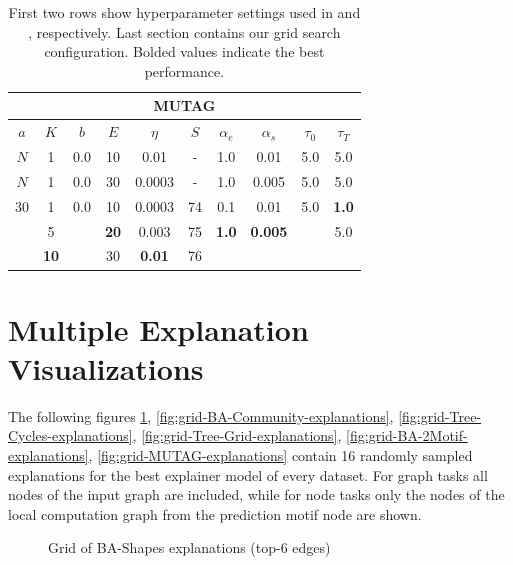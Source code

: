 \begin{table}[h]
  \centering
  \scriptsize
  \begin{tabular}{|c|c|c|c|c|c|c|c|c|c|}
  \hline
  \multicolumn{10}{|c|}{\textbf{MUTAG}} \\ \hline
  $a$ & $K$ & $b$ & $E$ & $\eta$ & $S$ & $\alpha_e$ & $\alpha_s$ & $\tau_0$ & $\tau_T$ \\ \hline
  $N$ & 1 & 0.0 & 10 & 0.01 & - & 1.0 & 0.01 & 5.0 & 5.0 \\ \hline
  $N$ & 1 & 0.0 & 30 & 0.0003 & - & 1.0 & 0.005 & 5.0 & 5.0 \\ \midrule
  30 & 1 & 0.0 & 10 & 0.0003 & 74 & 0.1 & 0.01 & 5.0 & \textbf{1.0} \\
   & 5 &  & \textbf{20} & 0.003 & 75 & \textbf{1.0} & \textbf{0.005} &  & 5.0 \\
   & \textbf{10} &  & 30 & \textbf{0.01} & 76 &  &  &  &  \\ \hline
  \end{tabular}
  \caption[MUTAG grid search]{First two rows show hyperparameter settings used in \cite{luo2020parameterized} and \cite{holdijk2021re}, respectively. Last section contains our grid search configuration. Bolded values indicate the best performance.}
\end{table}

\clearpage
\section{Multiple Explanation Visualizations}
\label{sec:grid_vis}
The following figures \ref{fig:grid-BA-Shapes-explanations}, \ref{fig:grid-BA-Community-explanations}, \ref{fig:grid-Tree-Cycles-explanations}, \ref{fig:grid-Tree-Grid-explanations}, \ref{fig:grid-BA-2Motif-explanations}, \ref{fig:grid-MUTAG-explanations} contain 16 randomly sampled explanations for the best explainer model of every dataset. For graph tasks all nodes of the input graph are included, while for node tasks only the nodes of the local computation graph from the prediction motif node are shown.

\begin{figure}[htbp]
    \centering
    \caption{Grid of BA-Shapes explanations (top-6 edges)}
    \label{fig:grid-BA-Shapes-explanations}
\end{figure}

